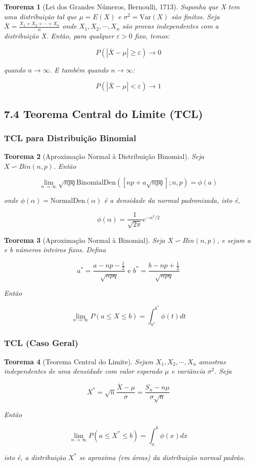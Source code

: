 \documentclass[12pt]{article}
\newtheorem{theorem}{Teorema}[section]
\begin{document}
\begin{theorem}[Lei dos Grandes Números, Bernoulli, 1713]
Suponha que X tem uma distribuição tal que $\mu = E(X)$ e $\sigma^2 = \text{Var}(X)$ são finitos. Seja $\overline{X} = \frac{X_1 + X_2 + \cdots + X_n}{n}$ onde $X_1, X_2, \cdots, X_n$ são provas independentes com a distribuição X. Então, para qualquer $\varepsilon > 0$ fixo, temos:

$$P(|\overline{X} - \mu| \geq \varepsilon) \rightarrow 0$$

quando $n \rightarrow \infty$. E também quando $n \rightarrow \infty$:

$$P(|\overline{X} - \mu| < \varepsilon) \rightarrow 1$$

\end{theorem}

\subsection*{7.4 Teorema Central do Limite (TCL)}
\subsubsection*{TCL para Distribuição Binomial}
\begin{theorem}[Aproximação Normal à Distribuição Binomial]
Seja $X \backsim Bin(n, p)$. Então

$$\lim_{n \rightarrow \infty} \sqrt{n p q} \text{BinomialDen}([np + a \sqrt{n p q} ]; n, p) = \phi(a)$$

onde $\phi(\alpha) = \text{NormalDen}(\alpha)$ é a densidade da normal padronizada, isto é,

$$\phi(\alpha) = \frac{1}{\sqrt{2 \pi}}e^{-\alpha^2/2}$$
\end{theorem}

\begin{theorem}[Aproximação Normal à Binomial]
Seja $X \backsim Bin(n, p)$, e sejam a e b números inteiros fixos. Defina

$$a^* = \frac{a - n p - \frac{1}{2}}{\sqrt{n p q}} \text{ e } b^* = \frac{b - n p + \frac{1}{2}}{\sqrt{n p q}}$$

Então

$$\lim_{n \rightarrow \infty} P(a \leq X \leq b) = \int_{a^*}^{b^*}\phi(t) d t$$
\end{theorem}

\subsubsection*{TCL (Caso Geral)}
\begin{theorem}[Teorema Central do Limite]
Sejam $X_1, X_2, \cdots, X_n$ amostras independentes de uma densidade com valor esperado $\mu$ e variância $\sigma^2$. Seja

$$X^* = \sqrt{n} \frac{\overline{X} - \mu}{\sigma} = \frac{S_n - n \mu}{\sigma \sqrt{n}}$$

Então

$$\lim_{n \rightarrow \infty} P(a \leq X^* \leq b) = \int_a^b \phi(x) d x$$

isto é, a distribuição $X^*$ se aproxima (em áreas) da distribuição normal padrão.
\end{theorem}
\end{document}
